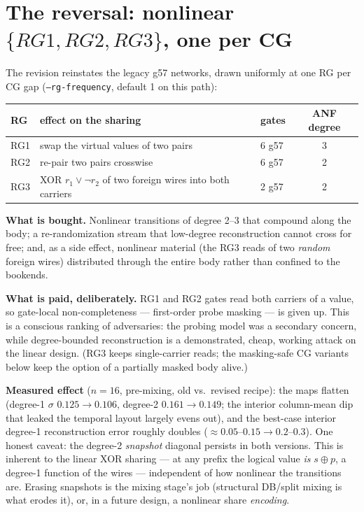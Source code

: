 \documentclass[11pt]{article}
\newcommand{\code}[1]{\texttt{#1}}
\begin{document}
\section{The reversal: nonlinear $\{RG1, RG2, RG3\}$, one per CG}

The revision reinstates the legacy g57 networks, drawn uniformly at one RG
per CG gap (\code{--rg-frequency}, default 1 on this path):

\begin{center}
\begin{tabular}{lllc}
\toprule
RG & effect on the sharing & gates & ANF degree \\
\midrule
RG1 & swap the virtual values of two pairs & 6 g57 & 3 \\
RG2 & re-pair two pairs crosswise & 6 g57 & 2 \\
RG3 & XOR $r_1 \vee \lnot r_2$ of two foreign wires into both carriers & 2 g57 & 2 \\
\bottomrule
\end{tabular}
\end{center}

\textbf{What is bought.} Nonlinear transitions of degree 2--3 that compound
along the body; a re-randomization stream that low-degree reconstruction
cannot cross for free; and, as a side effect, nonlinear material (the RG3
reads of two \emph{random} foreign wires) distributed through the entire
body rather than confined to the bookends.

\textbf{What is paid, deliberately.} RG1 and RG2 gates read both carriers
of a value, so gate-local non-completeness --- first-order probe masking
--- is given up. This is a conscious ranking of adversaries: the probing
model was a secondary concern, while degree-bounded reconstruction is a
demonstrated, cheap, working attack on the linear design. (RG3 keeps
single-carrier reads; the masking-safe CG variants below keep the option
of a partially masked body alive.)

\textbf{Measured effect} ($n{=}16$, pre-mixing, old vs.\ revised recipe):
the maps flatten (degree-1 $\sigma$ $0.125 \to 0.106$, degree-2 $0.161 \to
0.149$; the interior column-mean dip that leaked the temporal layout
largely evens out), and the best-case interior degree-1 reconstruction
error roughly doubles ($\approx 0.05$--$0.15 \to 0.2$--$0.3$). One honest
caveat: the degree-2 \emph{snapshot} diagonal persists in both versions.
This is inherent to the linear XOR sharing --- at any prefix the logical
value \emph{is} $s \oplus p$, a degree-1 function of the wires ---
independent of how nonlinear the transitions are. Erasing snapshots is the
mixing stage's job (structural DB/split mixing is what erodes it), or, in
a future design, a nonlinear share \emph{encoding}.
\end{document}
